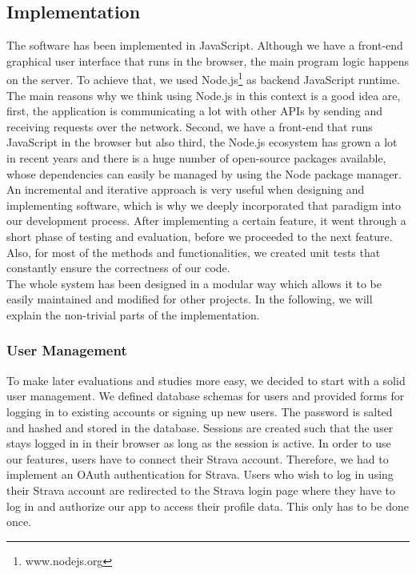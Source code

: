 \documentclass{sigchi}
\begin{document}
\subsection{Implementation}
The software has been implemented in JavaScript. Although we have a front-end graphical user interface that runs in the browser, the main program logic happens on the server. To achieve that, we used Node.js\footnote{www.nodejs.org} as backend JavaScript runtime. The main reasons why we think using Node.js in this context is a good idea are, first, the application is communicating a lot with other APIs by sending and receiving requests over the network. Second, we have a front-end that runs JavaScript in the browser but also third, the Node.js ecosystem has grown a lot in recent years and there is a huge number of open-source packages available, whose dependencies can easily be managed by using the Node package manager.\\
An incremental and iterative approach is very useful when designing and implementing software, which is why we deeply incorporated that paradigm into our development process. After implementing a certain feature, it went through a short phase of testing and evaluation, before we proceeded to the next feature. Also, for most of the methods and functionalities, we created unit tests that constantly ensure the correctness of our code.\\
The whole system has been designed in a modular way which allows it to be easily maintained and modified for other projects. In the following, we will explain the non-trivial parts of the implementation.
\subsubsection{User Management}
To make later evaluations and studies more easy, we decided to start with a solid user management. We defined database schemas for users and provided forms for logging in to existing accounts or signing up new users. The password is salted and hashed and stored in the database. Sessions are created such that the user stays logged in in their browser as long as the session is active. In order to use our features, users have to connect their Strava account. Therefore, we had to implement an OAuth authentication for Strava. Users who wish to log in using their Strava account are redirected to the Strava login page where they have to log in and authorize our app to access their profile data. This only has to be done once.
\end{document}
